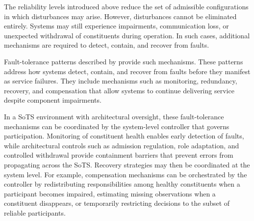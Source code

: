 
The reliability levels introduced above reduce the set of admissible configurations in which disturbances may arise. However, disturbances cannot be eliminated entirely. Systems may still experience impairments, communication loss, or unexpected withdrawal of constituents during operation. In such cases, additional mechanisms are required to detect, contain, and recover from faults. 

Fault-tolerance patterns described by \citet{hanmer2013patterns} provide such mechanisms. These patterns address how systems detect, contain, and recover from faults before they manifest as service failures. They include mechanisms such as monitoring, redundancy, recovery, and compensation that allow systems to continue delivering service despite component impairments.

In a SoTS environment with architectural oversight, these fault-tolerance mechanisms can be coordinated by the system-level controller that governs participation. Monitoring of constituent health enables early detection of faults, while architectural controls such as admission regulation, role adaptation, and controlled withdrawal provide containment barriers that prevent errors from propagating across the SoTS. Recovery strategies may then be coordinated at the system level. For example, compensation mechanisms can be orchestrated by the controller by redistributing responsibilities among healthy constituents when a participant becomes impaired, estimating missing observations when a constituent disappears, or temporarily restricting decisions to the subset of reliable participants.

